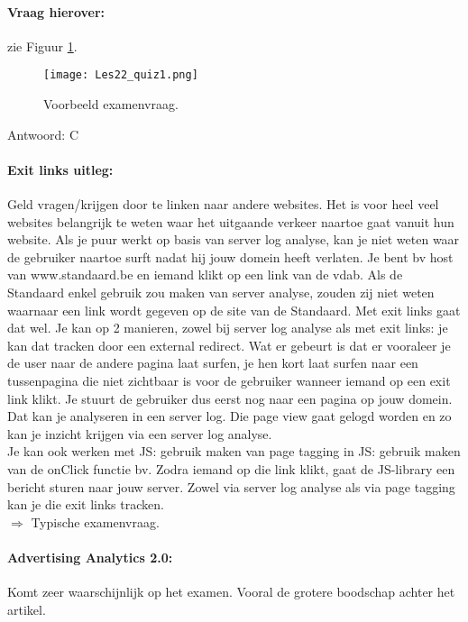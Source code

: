 \documentclass[10pt,a4paper]{report}
\begin{document}
\paragraph{Vraag hierover:} zie Figuur \ref{Les22_1}.

\begin{figure}[ht!]
\centering
\texttt{[image: Les22\_quiz1.png]}
\caption{Voorbeeld examenvraag. \label{Les22_1}}
\end{figure}

Antwoord: C

\paragraph{Exit links uitleg:}Geld vragen/krijgen door te linken naar andere websites. Het is voor heel veel websites belangrijk te weten waar het uitgaande verkeer naartoe gaat vanuit hun website. Als je puur werkt op basis van server log analyse, kan je niet weten waar de gebruiker naartoe surft nadat hij jouw domein heeft verlaten. Je bent bv host van www.standaard.be en iemand klikt op een link van de vdab. Als de Standaard enkel gebruik zou maken van server analyse, zouden zij niet weten waarnaar een link wordt gegeven op de site van de Standaard. Met exit links gaat dat wel. Je kan op 2 manieren, zowel bij server log analyse als met exit links: je kan dat tracken door een external redirect. Wat er gebeurt is dat er vooraleer je de user naar de andere pagina laat surfen, je hen kort laat surfen naar een tussenpagina die niet zichtbaar is voor de gebruiker wanneer iemand op een exit link klikt. Je stuurt de gebruiker dus eerst nog naar een pagina op jouw domein. Dat kan je analyseren in een server log. Die page view gaat gelogd worden en zo kan je inzicht krijgen via een server log analyse.\\
Je kan ook werken met JS: gebruik maken van page tagging in JS: gebruik maken van de onClick functie bv. Zodra iemand op die link klikt, gaat de JS-library een bericht sturen naar jouw server.
Zowel via server log analyse als via page tagging kan je die exit links tracken.\\
$\Rightarrow$ Typische examenvraag.

\paragraph{Advertising Analytics 2.0:}Komt zeer waarschijnlijk op het examen. Vooral de grotere boodschap achter het artikel.
\end{document}
